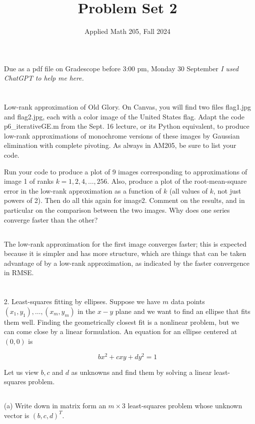 \documentclass[10pt]{article}
\title{Problem Set 2 }
\author{Applied Math 205, Fall 2024}
\date{}
\begin{document}
\maketitle
Due as a pdf file on Gradescope before 3:00 pm, Monday 30 September
\emph{I used ChatGPT to help me here.}
\section{}
Low-rank approximation of Old Glory. On Canvas, you will find two files flag1.jpg and flag2.jpg, each with a color image of the United States flag. Adapt the code p6\_iterativeGE.m from the Sept. 16 lecture, or its Python equivalent, to produce low-rank approximations of monochrome versions of these images by Gaussian elimination with complete pivoting. As always in AM205, be sure to list your code.

Run your code to produce a plot of 9 images corresponding to approximations of image 1 of ranks \(k=1,2,4, \ldots, 256\). Also, produce a plot of the root-mean-square error in the low-rank approximation as a function of \(k\) (all values of \(k\), not just powers of 2). Then do all this again for image2. Comment on the results, and in particular on the comparison between the two images. Why does one series converge faster than the other?\\
\subsection{}
The low-rank approximation for the first image converges faster; this is expected because it is simpler and has more structure, which are things that can be taken advantage of by a low-rank approximation, as indicated by the faster convergence in RMSE.
\section{}
2. Least-squares fitting by ellipses. Suppose we have $m$ data points $\left(x_{1}, y_{1}\right), \ldots,\left(x_{m}, y_{m}\right)$ in the $x-y$ plane and we want to find an ellipse that fits them well. Finding the geometrically closest fit is a nonlinear problem, but we can come close by a linear formulation. An equation for an ellipse centered at $(0,0)$ is

$$
b x^{2}+c x y+d y^{2}=1
$$

Let us view $b, c$ and $d$ as unknowns and find them by solving a linear least-squares problem.\\
\subsection{}
(a) Write down in matrix form an $m \times 3$ least-squares problem whose unknown vector is $(b, c, d)^{T}$.\\
\end{document}
